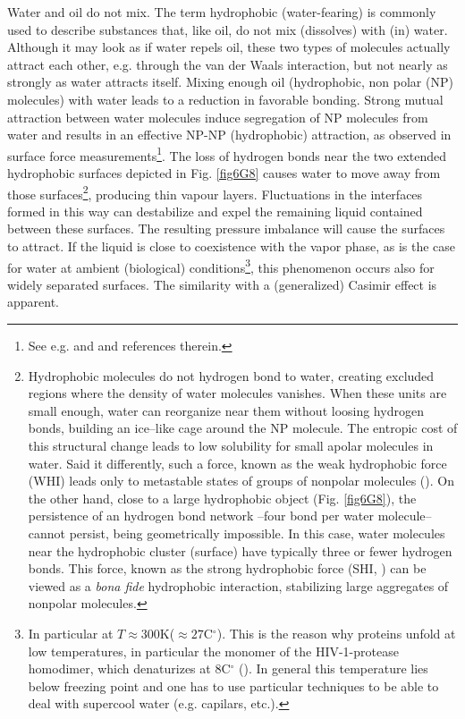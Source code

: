 \begin{subappendices}
Water and oil do not mix. The term hydrophobic (water-fearing) is commonly used to describe substances that, like oil, do not mix (dissolves) with (in) water. Although it may look as if water repels oil, these two types of molecules actually attract each other, e.g. through the van der Waals interaction, but not nearly as strongly as water attracts itself. Mixing enough oil (hydrophobic, non polar (NP) molecules) with water leads to a reduction in favorable bonding. Strong mutual attraction between water molecules induce segregation of NP molecules from water and results in an effective NP-NP (hydrophobic) attraction, as observed  in surface force measurements\footnote{See e.g. \cite{Chandler:02,Chandler:05} and \cite{Lum:99} and references therein.}. The loss of hydrogen bonds near the two extended hydrophobic surfaces depicted in Fig. \ref{fig6G8} causes water to move away from those surfaces\footnote{Hydrophobic molecules do not hydrogen bond to water, creating excluded regions where the density of water molecules vanishes. When these units are small enough, water can reorganize near them without loosing hydrogen bonds, building an ice--like cage around the NP molecule. The entropic cost of this structural change leads to low solubility for small apolar molecules in water. Said it differently, such a force, known as the weak hydrophobic force (WHI) leads only to metastable states of groups of nonpolar molecules (\cite{Chandler:02}). On the other hand, close to a large hydrophobic object (Fig. \ref{fig6G8}), the persistence of an hydrogen bond network --four bond per water molecule-- cannot persist, being geometrically impossible. In this case, water molecules near the hydrophobic cluster (surface) have typically three or fewer hydrogen bonds. This force, known as the strong hydrophobic force (SHI, \cite{Chandler:02}) can be viewed as a \textit{bona fide} hydrophobic interaction, stabilizing large aggregates of nonpolar molecules.}, producing thin vapour layers. Fluctuations in the interfaces formed in this way can destabilize and expel the remaining liquid contained between these surfaces. The resulting pressure imbalance will cause the surfaces to attract. If the liquid is close to coexistence with the vapor phase, as is the case for water at ambient (biological) conditions\footnote{In particular at $T\approx300$K($\approx 27$C$^\circ$). This is the reason why proteins unfold at low temperatures, in particular the monomer of the HIV-1-protease homodimer, which denaturizes at 8C$^\circ$ (\cite{Rosner:17}). In general this temperature lies below freezing point and one has to use particular techniques to be able to deal with supercool water (e.g. capilars, etc.).}, this phenomenon occurs also for widely separated surfaces. The similarity with a (generalized) Casimir effect is apparent. 



\end{subappendices}
